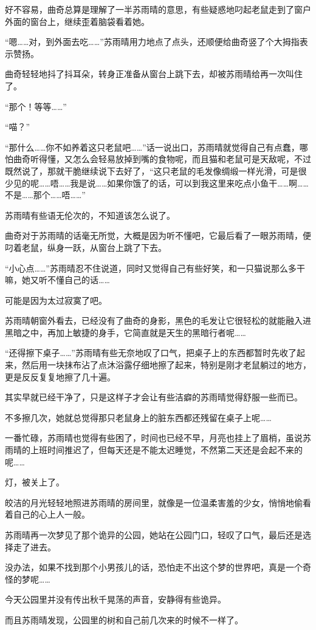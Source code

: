 好不容易，曲奇总算是理解了一半苏雨晴的意思，有些疑惑地叼起老鼠走到了窗户外面的窗台上，继续歪着脑袋看着她。

“嗯……对，到外面去吃……”苏雨晴用力地点了点头，还顺便给曲奇竖了个大拇指表示赞扬。

曲奇轻轻地抖了抖耳朵，转身正准备从窗台上跳下去，却被苏雨晴给再一次叫住了。

“那个！等等……”

“喵？”

“那什么……你不如养着这只老鼠吧……”话一说出口，苏雨晴就觉得自己有点蠢，哪怕曲奇听得懂，又怎么会轻易放掉到嘴的食物呢，而且猫和老鼠可是天敌呢，不过既然说了，那就干脆继续说下去好了，“这只老鼠的毛发像绸缎一样光滑，可是很少见的呢……唔……我是说……如果你饿了的话，可以到我这里来吃点小鱼干……啊……不是……那个……唔……”

苏雨晴有些语无伦次的，不知道该怎么说了。

曲奇对于苏雨晴的话毫无所觉，大概是因为听不懂吧，它最后看了一眼苏雨晴，便叼着老鼠，纵身一跃，从窗台上跳了下去。

“小心点……”苏雨晴忍不住说道，同时又觉得自己有些好笑，和一只猫说那么多干嘛，她又听不懂自己的话……

可能是因为太过寂寞了吧。

苏雨晴朝窗外看去，已经没有了曲奇的身影，黑色的毛发让它很轻松的就能融入进黑暗之中，再加上敏捷的身手，它简直就是天生的黑暗行者呢……

“还得擦下桌子……”苏雨晴有些无奈地叹了口气，把桌子上的东西都暂时先收了起来，然后用一块抹布沾了点沐浴露仔细地擦了起来，特别是刚才老鼠躺过的地方，更是反反复复地擦了几十遍。

其实早就已经干净了，只是这样子才会让有些洁癖的苏雨晴觉得舒服一些而已。

不多擦几次，她就总觉得那只老鼠身上的脏东西都还残留在桌子上呢……

一番忙碌，苏雨晴也觉得有些困了，时间也已经不早，月亮也挂上了眉梢，虽说苏雨晴的上班时间推迟了，但每天还是不能太迟睡觉，不然第二天还是会起不来的呢……

灯，被关上了。

皎洁的月光轻轻地照进苏雨晴的房间里，就像是一位温柔害羞的少女，悄悄地偷看着自己的心上人一般。

苏雨晴再一次梦见了那个诡异的公园，她站在公园门口，轻叹了口气，最后还是选择走了进去。

没办法，如果不找到那个小男孩儿的话，恐怕走不出这个梦的世界吧，真是一个奇怪的梦呢……

今天公园里并没有传出秋千晃荡的声音，安静得有些诡异。

而且苏雨晴发现，公园里的树和自己前几次来的时候不一样了。

